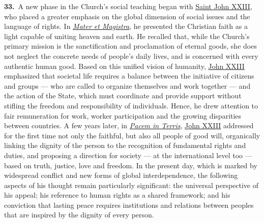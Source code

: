 \documentclass{article}
\begin{document}
\textbf{33.}\ A new phase in the Church's social teaching began with \href{https://www.vatican.va/content/john-xxiii/en.html}{Saint John XXIII}, who placed a greater emphasis on the global dimension of social issues and the language of rights. In \href{https://www.vatican.va/content/john-xxiii/en/encyclicals/documents/hf_j-xxiii_enc_15051961_mater.html}{\emph{Mater et Magistra}}, he presented the Christian faith as a light capable of uniting heaven and earth. He recalled that, while the Church's primary mission is the sanctification and proclamation of eternal goods, she does not neglect the concrete needs of people's daily lives, and is concerned with every authentic human good.\cite{n27} Based on this unified vision of humanity, \href{https://www.vatican.va/content/john-xxiii/en.html}{John XXIII} emphasized that societal life requires a balance between the initiative of citizens and groups --- who are called to organize themselves and work together --- and the action of the State, which must coordinate and provide support without stifling the freedom and responsibility of individuals. Hence, he drew attention to fair remuneration for work, worker participation and the growing disparities between countries. A few years later, in \href{https://www.vatican.va/content/john-xxiii/en/encyclicals/documents/hf_j-xxiii_enc_11041963_pacem.html}{\emph{Pacem in Terris}}, \href{https://www.vatican.va/content/john-xxiii/en.html}{John XXIII} addressed for the first time not only the faithful, but also all people of good will, organically linking the dignity of the person to the recognition of fundamental rights and duties, and proposing a direction for society --- at the international level too --- based on truth, justice, love and freedom.\cite{n28} In the present day, which is marked by widespread conflict and new forms of global interdependence, the following aspects of his thought remain particularly significant: the universal perspective of his appeal; his reference to human rights as a shared framework; and his conviction that lasting peace requires institutions and relations between peoples that are inspired by the dignity of every person.
\end{document}
